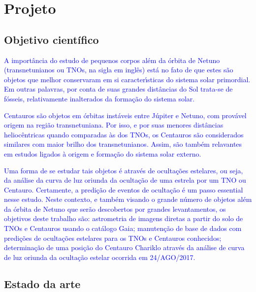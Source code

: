 \documentclass[a4paper, 11pt]{article}
\begin{document}
\renewcommand{\figurename}{\textsc{Figura}}
\renewcommand{\tablename}{\textsc{Tabela}}
\renewcommand{\refname}{Refer\^encias}




\section{Projeto}

\subsection{Objetivo científico}

\textcolor{blue}{A importância do estudo de pequenos corpos al\'em da \'orbita de Netuno (transnetunianos ou TNOs, na sigla em ingl\^es) est\'a no fato de que estes s\~ao objetos que melhor conservaram em si caracter\'{\i}sticas do sistema solar primordial. Em outras palavras, por conta de suas grandes dist\^ancias do Sol trata-se de f\'osseis, relativamente inalterados da forma\c c\~ao do sistema solar.}

\textcolor{blue}{Centauros s\~ao objetos em \'orbitas inst\'aveis entre J\'upiter e Netuno, com prov\'avel origem na regi\~ao transnetuniana. Por isso, e por suas menores dist\^ancias helioc\^entricas quando comparadas \`as dos TNOs, os Centauros s\~ao considerados similares com maior brilho dos transnetunianos. Assim, s\~ao tamb\'em relavantes em estudos ligados \`a origem e forma\c c\~ao do sistema solar externo.}

\textcolor{blue}{Uma forma de se estudar tais objetos \'e atrav\'es de oculta\c c\~oes estelares, ou seja, da an\'alise da curva de luz oriunda da oculta\c c\~ao de uma estrela por um TNO ou Centauro. Certamente, a predi\c c\~ao de eventos de oculta\c c\~ao \'e um passo essential nesse estudo. Neste contexto, e tamb\'em visando o grande n\'umero de objetos al\'em da \'orbita de Netuno que ser\~ao descobertos por grandes levantamentos, os objetivos deste trabalho s\~ao: astrometria de imagens diretas a partir do solo de TNOs e Centauros usando o cat\'alogo Gaia; manuten\c c\~ao de base de dados com predi\c c\~oes de oculta\c c\~oes estelares para os TNOs e Centauros conhecidos; determina\c c\~ao de uma posi\c c\~ao do Centauro Chariklo atrav\'es da an\'alise de curva de luz oriunda da  oculta\c c\~ao estelar ocorrida em 24/AGO/2017.}

\subsection{Estado da arte}
\end{document}
